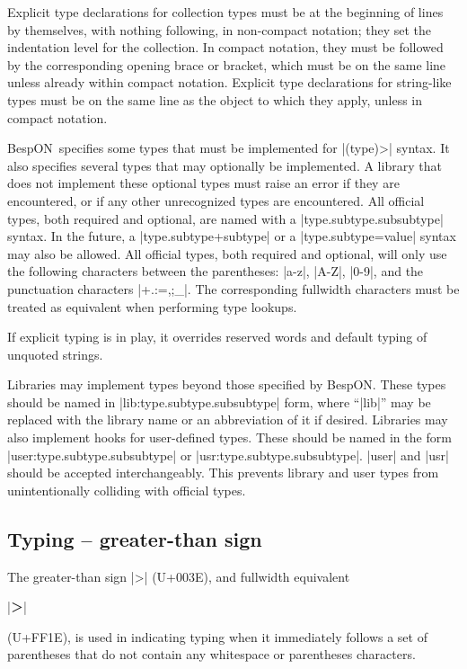 \documentclass[11pt]{article}
\newcommand{\bespon}{BespON}
\begin{document}
Explicit type declarations for collection types must be at the beginning of lines by themselves, with nothing following, in non-compact notation; they set the indentation level for the collection.  In compact notation, they must be followed by the corresponding opening brace or bracket, which must be on the same line unless already within compact notation.  Explicit type declarations for string-like types must be on the same line as the object to which they apply, unless in compact notation.

\bespon\ specifies some types that must be implemented for |(type)>| syntax.  It also specifies several types that may optionally be implemented.  A library that does not implement these optional types must raise an error if they are encountered, or if any other unrecognized types are encountered.  All official types, both required and optional, are named with a |type.subtype.subsubtype| syntax.  In the future, a |type.subtype+subtype| or a |type.subtype=value| syntax may also be allowed.  All official types, both required and optional, will only use the following characters between the parentheses: |a-z|, |A-Z|, |0-9|, and the punctuation characters |+.:=,;_|.  The corresponding fullwidth characters must be treated as equivalent when performing type lookups.

If explicit typing is in play, it overrides reserved words and default typing of unquoted strings.

Libraries may implement types beyond those specified by \bespon.  These types should be named in |lib:type.subtype.subsubtype| form, where ``|lib|'' may be replaced with the library name or an abbreviation of it if desired.  Libraries may also implement hooks for user-defined types.  These should be named in the form |user:type.subtype.subsubtype| or |usr:type.subtype.subsubtype|.  |user| and |usr| should be accepted interchangeably.  This prevents library and user types from unintentionally colliding with official types.


\subsection{Typing -- greater-than sign}

The greater-than sign |>| (U+003E), and fullwidth equivalent \begin{CJK*}{UTF8}{gkai}|＞|\end{CJK*} (U+FF1E), is used in indicating typing when it immediately follows a set of parentheses that do not contain any whitespace or parentheses characters.
\end{document}
